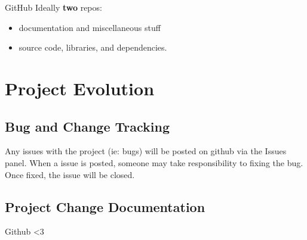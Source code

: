 \documentclass [12pt]{article}
\begin{document}
																																																																			GitHub
																																																																			Ideally \textbf{two} repos: 
																																																																			\begin{itemize} 
																																																																				\item  documentation and miscellaneous stuff
																																																																					\item  source code, libraries, and dependencies.
																																																																					\end{itemize}





																																																																					\section{Project Evolution}

																																																																					\subsection{Bug and Change Tracking}
																																																																					Any issues with the project (ie: bugs) will  be posted on github via the Issues panel. When a issue is posted, someone may take responsibility to fixing the bug. Once fixed, the issue will be closed.

																																																																					\subsection{Project Change Documentation}
																																																																					Github <3
\end{document}
